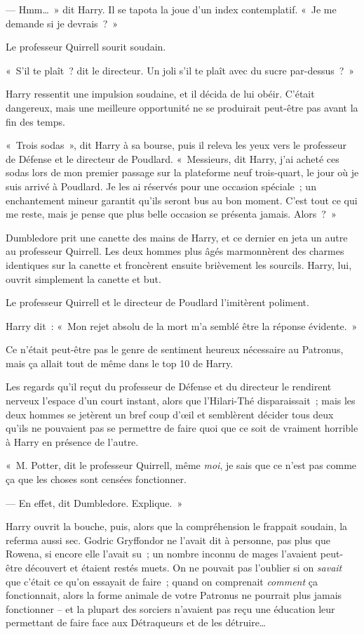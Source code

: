 --- Hmm…~»
dit Harry.
Il se tapota la joue d'un index contemplatif.
«~Je me demande si je devrais~?~»

Le professeur Quirrell sourit soudain.

«~S'il te plaît~? dit le directeur.
Un joli s'il te plaît avec du sucre par-dessus~?~»

Harry ressentit une impulsion soudaine, et il décida de lui obéir.
C'était dangereux, mais une meilleure opportunité ne se produirait peut-être pas avant la fin des temps.

«~Trois sodas~», dit Harry à sa bourse, puis il releva les yeux vers le professeur de Défense et le directeur de Poudlard.
«~Messieurs, dit Harry, j'ai acheté ces sodas lors de mon premier passage sur la plateforme neuf trois-quart, le jour où je suis arrivé à Poudlard.
Je les ai réservés pour une occasion spéciale~; un enchantement mineur garantit qu'ils seront bus au bon moment.
C'est tout ce qui me reste, mais je pense que plus belle occasion se présenta jamais.
Alors~?~»

Dumbledore prit une canette des mains de Harry, et ce dernier en jeta un autre au professeur Quirrell.
Les deux hommes plus âgés marmonnèrent des charmes identiques sur la canette et froncèrent ensuite brièvement les sourcils.
Harry, lui, ouvrit simplement la canette et but.

Le professeur Quirrell et le directeur de Poudlard l'imitèrent poliment.

Harry dit~: «~Mon rejet absolu de la mort m'a semblé être la réponse évidente.~»

Ce n'était peut-être pas le genre de sentiment heureux nécessaire au Patronus, mais ça allait tout de même dans le top 10 de Harry.

Les regards qu'il reçut du professeur de Défense et du directeur le rendirent nerveux l'espace d'un court instant, alors que l'Hilari-Thé disparaissait~; mais les deux hommes se jetèrent un bref coup d'œil et semblèrent décider tous deux qu'ils ne pouvaient pas se permettre de faire quoi que ce soit de vraiment horrible à Harry en présence de l'autre.

«~M. Potter, dit le professeur Quirrell, même \emph{moi}, je sais que ce n'est pas comme ça que les choses sont censées fonctionner.

--- En effet, dit Dumbledore.
Explique.~»

Harry ouvrit la bouche, puis, alors que la compréhension le frappait soudain, la referma aussi sec.
Godric Gryffondor ne l'avait dit à personne, pas plus que Rowena, si encore elle l'avait su~; un nombre inconnu de mages l'avaient peut-être découvert et étaient restés muets.
On ne pouvait pas l'oublier si on \emph{savait} que c'était ce qu'on essayait de faire~; quand on comprenait \emph{comment} ça fonctionnait, alors la forme animale de votre Patronus ne pourrait plus jamais fonctionner -- et la plupart des sorciers n'avaient pas reçu une éducation leur permettant de faire face aux Détraqueurs et de les détruire…

